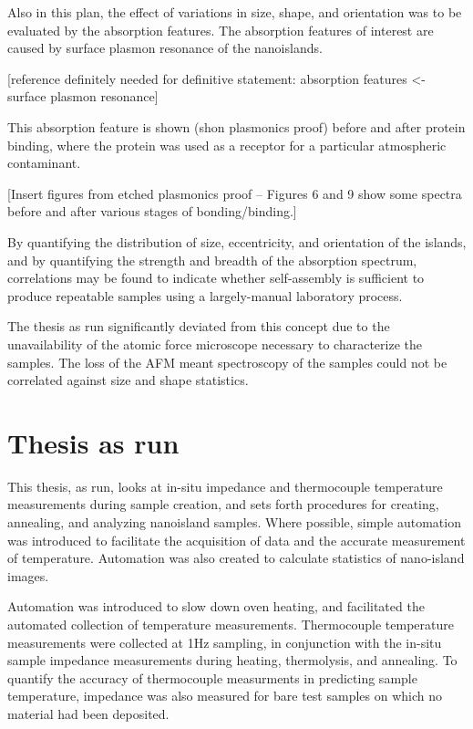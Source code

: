 Also in this plan, the effect of variations in size, shape, and orientation was to be evaluated by the absorption features. 
The absorption features of interest are caused by surface plasmon resonance of the nanoislands.

[reference definitely needed for definitive statement: absorption features <- surface plasmon resonance]

This absorption feature is shown (shon plasmonics proof) before and after protein binding, where the protein was used as a receptor for a particular atmospheric contaminant.

[Insert figures from etched plasmonics proof -- Figures 6 and 9 show some spectra before and after various stages of bonding/binding.]

By quantifying the distribution of size, eccentricity, and orientation of the islands, 
and by quantifying the strength and breadth of the absorption spectrum, 
correlations may be found to indicate whether self-assembly is sufficient to produce repeatable samples using a largely-manual laboratory process.

The thesis as run significantly deviated from this concept due to the unavailability of the atomic force microscope necessary to characterize the samples.  
The loss of the AFM meant spectroscopy of the samples could not be correlated against size and shape statistics.

\section{Thesis as run}

This thesis, as run, looks at in-situ impedance and thermocouple temperature measurements during sample creation, and sets forth procedures for creating, annealing, and analyzing nanoisland samples.  
Where possible, simple automation was introduced to facilitate the acquisition of data and the accurate measurement of temperature.
Automation was also created to calculate statistics of nano-island images.

Automation was introduced to slow down oven heating, and facilitated the automated collection of temperature measurements.
Thermocouple temperature measurements were collected at 1Hz sampling, in conjunction with the in-situ sample impedance measurements 
    during heating, thermolysis, and annealing.  
To quantify the accuracy of thermocouple measurments in predicting sample temperature, 
    impedance was also measured for bare test samples on which no material had been deposited. 

